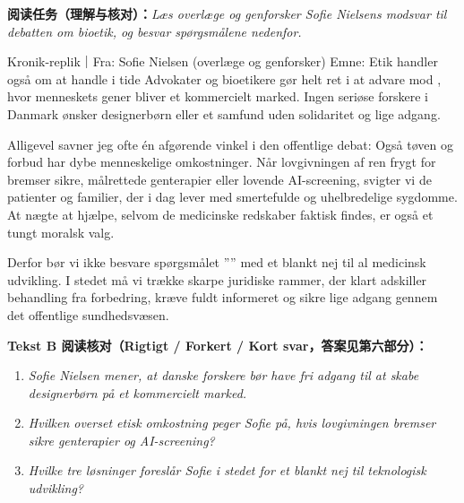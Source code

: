 \textbf{阅读任务（理解与核对）：}\textit{Læs overlæge og genforsker Sofie Nielsens modsvar til debatten om bioetik, og besvar spørgsmålene nedenfor.}

\begin{emailbox}{Kronik-replik｜Fra: Sofie Nielsen (overlæge og genforsker) \quad Emne: Etik handler også om at handle i tide}
Advokater og bioetikere gør helt ret i at advare mod , hvor menneskets gener bliver et kommercielt marked. Ingen seriøse forskere i Danmark ønsker designerbørn eller et samfund uden solidaritet og lige adgang.

Alligevel savner jeg ofte én afgørende vinkel i den offentlige debat: Også tøven og forbud har dybe menneskelige omkostninger. Når lovgivningen af ren frygt for  bremser sikre, målrettede genterapier eller lovende AI-screening, svigter vi de patienter og familier, der i dag lever med smertefulde og uhelbredelige sygdomme. At nægte at hjælpe, selvom de medicinske redskaber faktisk findes, er også et tungt moralsk valg.

Derfor bør vi ikke besvare spørgsmålet ”” med et blankt nej til al medicinsk udvikling. I stedet må vi trække skarpe juridiske rammer, der klart adskiller behandling fra forbedring, kræve fuldt informeret  og sikre lige adgang gennem det offentlige sundhedsvæsen.
\end{emailbox}

\textbf{Tekst B 阅读核对（Rigtigt / Forkert / Kort svar，答案见第六部分）：}
\begin{enumerate}
  \item \textit{Sofie Nielsen mener, at danske forskere bør have fri adgang til at skabe designerbørn på et kommercielt marked.} \underline{\hspace{2.2cm}}
  \item \textit{Hvilken overset etisk omkostning peger Sofie på, hvis lovgivningen bremser sikre genterapier og AI-screening?} \underline{\hspace{2.2cm}}
  \item \textit{Hvilke tre løsninger foreslår Sofie i stedet for et blankt nej til teknologisk udvikling?} \underline{\hspace{2.2cm}}
\end{enumerate}

